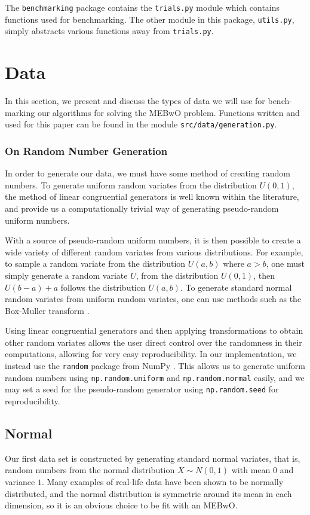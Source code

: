 \documentclass[11pt,twoside]{report}
\theoremstyle{definition}
\numberwithin{theorem}{section}
\numberwithin{definition}{section}
\numberwithin{lemma}{section}
\numberwithin{proposition}{section}
\numberwithin{equation}{section}
\numberwithin{figure}{section}
\begin{document}
The \texttt{benchmarking} package contains the \texttt{trials.py} module which contains functions used for benchmarking. The other module in this package, \texttt{utils.py}, simply abstracts various functions away from \texttt{trials.py}.

\section{Data}\label{data}
In this section, we present and discuss the types of data we will use for bench-marking our algorithms for solving the MEBwO problem. Functions written and used for this paper can be found in the module \texttt{src/data/generation.py}.

\subsubsection{On Random Number Generation}
In order to generate our data, we must have some method of creating random numbers. To generate uniform random variates from the distribution $U(0,1)$, the method of linear congruential generators \cite{lcg1,lcg2} is well known within the literature, and provide us a computationally trivial way of generating pseudo-random uniform numbers.

With a source of pseudo-random uniform numbers, it is then possible to create a wide variety of different random variates from various distributions. For example, to sample a random variate from the distribution $U(a,b)$ where $a>b$, one must simply generate a random variate $U$, from the distribution $U(0,1)$, then $U(b-a)+a$ follows the distribution $U(a,b)$. To generate standard normal random variates from uniform random variates, one can use methods such as the Box-Muller transform \cite{boxmuller}.

Using linear congruential generators and then applying transformations to obtain other random variates allows the user direct control over the randomness in their computations, allowing for very easy reproducibility. In our implementation, we instead use the \texttt{random} package from NumPy \cite{numpy}. This allows us to generate uniform random numbers using \texttt{np.random.uniform} and \texttt{np.random.normal} easily, and we may set a seed for the pseudo-random generator using \texttt{np.random.seed} for reproducibility.


\subsection{Normal}
Our first data set is constructed by generating standard normal variates, that is, random numbers from the normal distribution $X\sim N(0,1)$ with mean $0$ and variance $1$. Many examples of real-life data have been shown to be normally distributed, and the normal distribution is symmetric around its mean in each dimension, so it is an obvious choice to be fit with an MEBwO.
\end{document}
